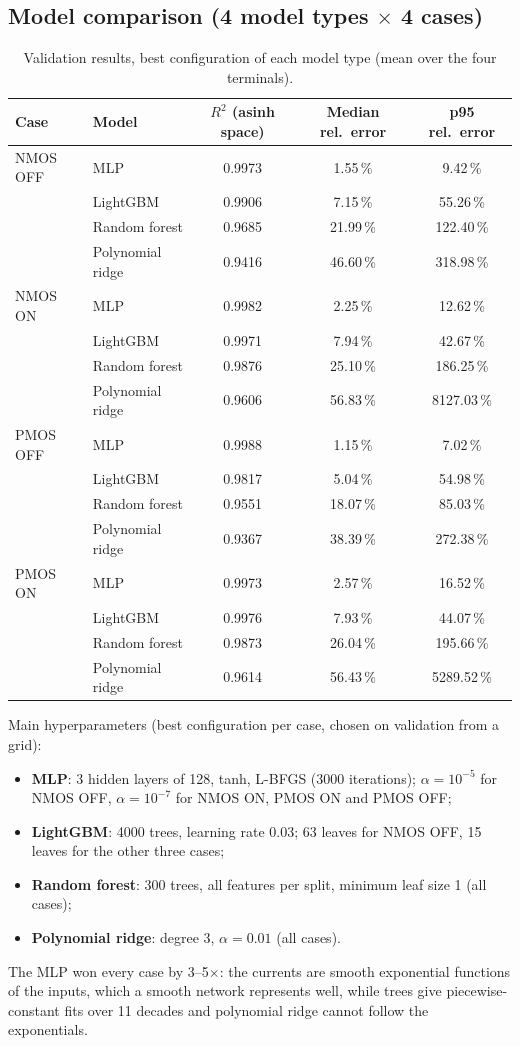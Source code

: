 \documentclass[11pt,a4paper]{article}
\newcommand{\pct}{\,\%}
\begin{document}
\subsection{Model comparison (4 model types $\times$ 4 cases)}
\begin{table}[H]
\centering
\caption{Validation results, best configuration of each model type (mean over the four terminals).}
\begin{tabular}{llccc}
\toprule
Case & Model & $R^2$ (asinh space) & Median rel.\ error & p95 rel.\ error \\
\midrule
NMOS OFF & MLP & 0.9973 & 1.55\pct & 9.42\pct \\
 & LightGBM & 0.9906 & 7.15\pct & 55.26\pct \\
 & Random forest & 0.9685 & 21.99\pct & 122.40\pct \\
 & Polynomial ridge & 0.9416 & 46.60\pct & 318.98\pct \\
\midrule
NMOS ON & MLP & 0.9982 & 2.25\pct & 12.62\pct \\
 & LightGBM & 0.9971 & 7.94\pct & 42.67\pct \\
 & Random forest & 0.9876 & 25.10\pct & 186.25\pct \\
 & Polynomial ridge & 0.9606 & 56.83\pct & 8127.03\pct \\
\midrule
PMOS OFF & MLP & 0.9988 & 1.15\pct & 7.02\pct \\
 & LightGBM & 0.9817 & 5.04\pct & 54.98\pct \\
 & Random forest & 0.9551 & 18.07\pct & 85.03\pct \\
 & Polynomial ridge & 0.9367 & 38.39\pct & 272.38\pct \\
\midrule
PMOS ON & MLP & 0.9973 & 2.57\pct & 16.52\pct \\
 & LightGBM & 0.9976 & 7.93\pct & 44.07\pct \\
 & Random forest & 0.9873 & 26.04\pct & 195.66\pct \\
 & Polynomial ridge & 0.9614 & 56.43\pct & 5289.52\pct \\
\bottomrule
\end{tabular}
\end{table}

Main hyperparameters (best configuration per case, chosen on validation from a grid):
\begin{itemize}[nosep]
\item \textbf{MLP}: 3 hidden layers of 128, tanh, L-BFGS (3000 iterations); $\alpha = 10^{-5}$ for NMOS OFF,
$\alpha = 10^{-7}$ for NMOS ON, PMOS ON and PMOS OFF;
\item \textbf{LightGBM}: 4000 trees, learning rate 0.03; 63 leaves for NMOS OFF, 15 leaves for the other three cases;
\item \textbf{Random forest}: 300 trees, all features per split, minimum leaf size 1 (all cases);
\item \textbf{Polynomial ridge}: degree 3, $\alpha = 0.01$ (all cases).
\end{itemize}
The MLP won every case by 3--5$\times$: the currents are smooth exponential functions of the inputs, which a
smooth network represents well, while trees give piecewise-constant fits over 11 decades and polynomial ridge
cannot follow the exponentials.
\end{document}
